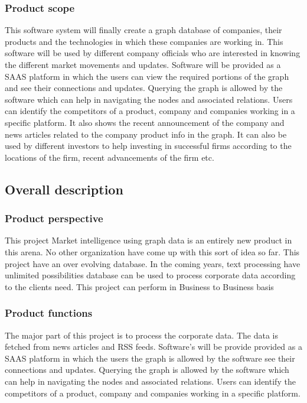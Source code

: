 \subsubsection{Product scope}
\par This software system will finally create a graph database of companies, their products and the technologies in which these companies are working in. This software will be used by different company officials who are interested in knowing the different market movements and updates. Software will be provided as a SAAS platform in which the users can view the required portions of the graph and see their connections and updates. Querying the graph is allowed by the software which can help in navigating the nodes and associated relations. Users can identify the competitors of a product, company and companies working in a specific platform. It also shows the recent announcement of the company and news articles related to the company product info in the graph. It can also be used by different investors to help investing in successful firms according to the locations of the firm, recent advancements of the firm etc.
\subsection{Overall description}
\subsubsection{Product perspective}
\par This project Market intelligence using graph data is an entirely new product in this arena.   No other organization have come up with this sort of idea so far. This project have an over evolving database. In the coming years, text processing have unlimited possibilities database can be used to process corporate data according to the clients need. This project can perform in Business to Business basis
\subsubsection{Product functions}
\par The major part of this project is to process the corporate data. The data is fetched from
news articles and RSS feeds. Software’s will be provide provided as a SAAS platform in which the users the graph is allowed by the software see their connections and updates. Querying the graph is allowed by the software which can help in navigating the nodes and associated relations. Users can identify the competitors of a product, company and companies working in a
specific platform.
